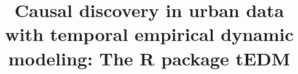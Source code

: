 \documentclass[authoryear,preprint,review,12pt]{elsarticle}
\begin{document}
\begin{frontmatter}
\title{Causal discovery in urban data with temporal empirical dynamic modeling: The R package tEDM}












\end{frontmatter}
\end{document}
